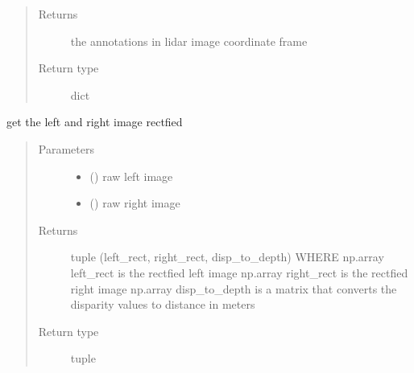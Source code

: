 \documentclass[letterpaper,10pt,english]{sphinxmanual}
\begin{document}
\begin{fulllineitems}
\begin{fulllineitems}
\begin{quote}
\begin{description}
\begin{itemize}
\end{itemize}

\item[{Returns}] \leavevmode
the annotations in lidar image coordinate frame

\item[{Return type}] \leavevmode
dict

\end{description}\end{quote}

\end{fulllineitems}


\begin{fulllineitems}
\label{\detokenize{radiate:radiate.Sequence.get_rectfied}}
get the left and right image rectfied
\begin{quote}\begin{description}
\item[{Parameters}] \leavevmode\begin{itemize}
\item {} 
 () \textendash{} raw left image

\item {} 
 () \textendash{} raw right image

\end{itemize}

\item[{Returns}] \leavevmode
tuple (left\_rect, right\_rect, disp\_to\_depth)
WHERE
np.array left\_rect is the rectfied left image
np.array right\_rect is the rectfied right image
np.array disp\_to\_depth is a matrix that converts the disparity values to distance in meters

\item[{Return type}] \leavevmode
tuple

\end{description}\end{quote}

\end{fulllineitems}



\end{fulllineitems}
\end{document}
